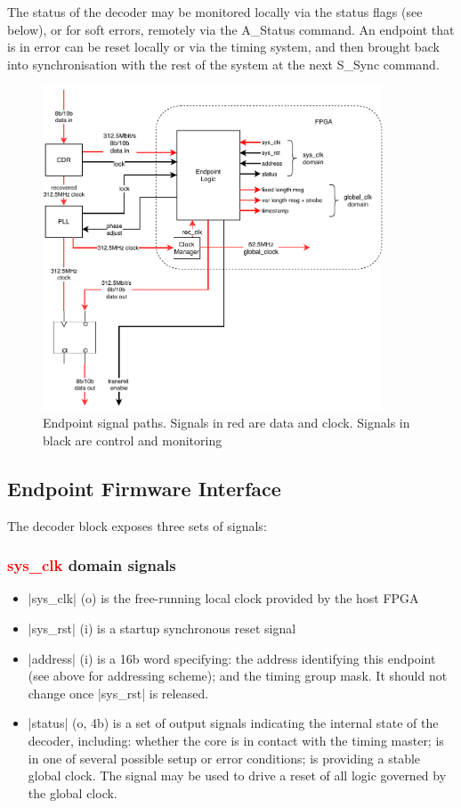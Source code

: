 \documentclass{dune}
\begin{document}
The status of the decoder may be monitored locally via the status flags (see below), or for soft errors, remotely via the A\_Status command. An endpoint that is in error can be reset locally or via the timing system, and then brought back into synchronisation with the rest of the system at the next S\_Sync command.

\begin{figure}[p]
	\centering
	\includegraphics[width=0.9\textwidth]{timing_endpoint_block.pdf}
	\caption{Endpoint signal paths. Signals in red are data and clock. Signals in black are control and monitoring}
	\label{fig:fw_if}
\end{figure}

\subsection{Endpoint Firmware Interface}

The decoder block exposes three sets of signals:

\subsubsection{\textcolor{red}{sys\_clk} domain signals}

\begin{itemize}
	\item |sys_clk| (o) is the free-running local clock provided by the host FPGA
	\item |sys_rst| (i) is a startup synchronous reset signal
	\item |address| (i) is a 16b word specifying: the address identifying this endpoint (see above for addressing scheme); and the timing group mask. It should not change once |sys_rst| is released.
	\item |status| (o, 4b) is a set of output signals indicating the internal state of the decoder, including: whether the core is in contact with the timing master; is in one of several possible setup or error conditions; is providing a stable global clock. The signal may be used to drive a reset of all logic governed by the global clock.
\end{itemize}
\end{document}
